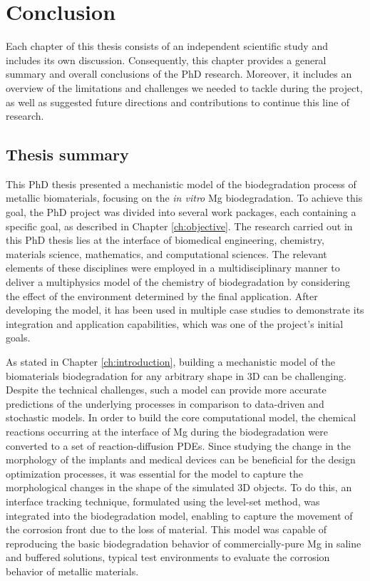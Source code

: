 \chapter{Conclusion}\label{ch:conclusion}


Each chapter of this thesis consists of an independent scientific study and includes its own discussion. Consequently, this chapter provides a general summary and overall conclusions of the PhD research. Moreover, it includes an overview of the limitations and challenges we needed to tackle during the project, as well as suggested future directions and contributions to continue this line of research.

\section{Thesis summary} \label{sec:conclusion_summary}


This PhD thesis presented a mechanistic model of the biodegradation process of metallic biomaterials, focusing on the \textit{in vitro} Mg biodegradation. To achieve this goal, the PhD project was divided into several work packages, each containing a specific goal, as described in Chapter \ref{ch:objective}. The research carried out in this PhD thesis lies at the interface of biomedical engineering, chemistry, materials science, mathematics, and computational sciences. The relevant elements of these disciplines were employed in a multidisciplinary manner to deliver a multiphysics model of the chemistry of biodegradation by considering the effect of the environment determined by the final application. After developing the model, it has been used in multiple case studies to demonstrate its integration and application capabilities, which was one of the project's initial goals.

As stated in Chapter \ref{ch:introduction}, building a mechanistic model of the biomaterials biodegradation for any arbitrary shape in 3D can be challenging. Despite the technical challenges, such a model can provide more accurate predictions of the underlying processes in comparison to data-driven and stochastic models. In order to build the core computational model, the chemical reactions occurring at the interface of Mg during the biodegradation were converted to a set of reaction-diffusion \gls{PDE}s. Since studying the change in the morphology of the implants and medical devices can be beneficial for the design optimization processes, it was essential for the model to capture the morphological changes in the shape of the simulated 3D objects. To do this, an interface tracking technique, formulated using the level-set method, was integrated into the biodegradation model, enabling to capture the movement of the corrosion front due to the loss of material. This model was capable of reproducing the basic biodegradation behavior of commercially-pure Mg in saline and buffered solutions, typical test environments to evaluate the corrosion behavior of metallic materials.

